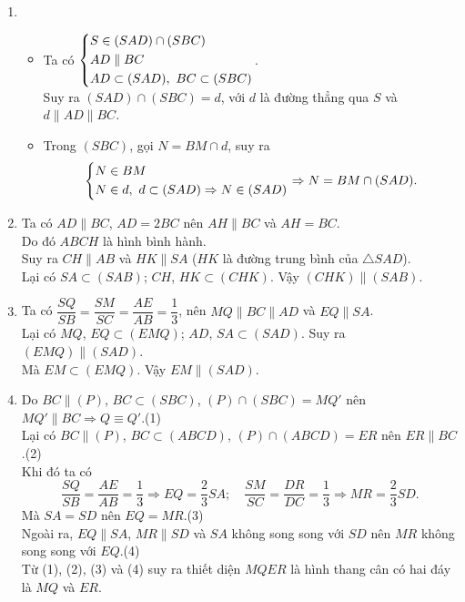 \begin{bt}
{\begin{center}
\end{center}
\begin{enumerate}
\item
\begin{itemize}
\item Ta có $\left\{\begin{aligned}& S\in(SAD)\cap (SBC)\\ & AD\parallel BC\\ & AD\subset(SAD),\,\,BC\subset(SBC)\end{aligned}\right.$.\\
Suy ra $(SAD)\cap (SBC)=d$, với $d$ là đường thẳng qua $S$ và $d\parallel AD\parallel BC$.
\item Trong $(SBC)$, gọi $N=BM\cap d$, suy ra
$$\left\{\begin{aligned}& N\in BM\\ & N\in d,\,\, d\subset (SAD)\Rightarrow N\in (SAD)\end{aligned}\right.\Rightarrow N=BM\cap (SAD).$$
\end{itemize}
\item Ta có $AD\parallel BC$, $AD=2BC$ nên $AH\parallel BC$ và $AH=BC$.\\
Do đó $ABCH$ là hình bình hành.\\
Suy ra $CH\parallel AB$ và $HK\parallel SA$ ($HK$ là đường trung bình của $\triangle SAD$).\\
Lại có $SA\subset (SAB)$; $CH$, $HK\subset (CHK)$. Vậy $(CHK)\parallel(SAB)$.
\item Ta có $\dfrac{SQ}{SB}=\dfrac{SM}{SC}=\dfrac{AE}{AB}=\dfrac{1}{3}$, nên $MQ\parallel BC\parallel AD$ và $EQ\parallel SA$.\\
Lại có $MQ$, $EQ\subset (EMQ)$; $AD$, $SA\subset (SAD)$. Suy ra $(EMQ)\parallel (SAD)$.\\
Mà $EM\subset (EMQ)$. Vậy $EM\parallel (SAD)$.
\item Do $BC\parallel (P)$, $BC\subset (SBC)$, $(P)\cap (SBC)=MQ'$ nên $MQ'\parallel BC\Rightarrow Q\equiv Q'$.\hfill (1)\\
Lại có $BC\parallel (P)$, $BC\subset (ABCD)$, $(P)\cap (ABCD)=ER$ nên $ER\parallel BC$.\hfill (2)\\
Khi đó ta có 
$$\dfrac{SQ}{SB}=\dfrac{AE}{AB}=\dfrac{1}{3}\Rightarrow EQ=\dfrac{2}{3}SA;\quad \dfrac{SM}{SC}=\dfrac{DR}{DC}=\dfrac{1}{3}\Rightarrow MR=\dfrac{2}{3}SD.$$
Mà $SA=SD$ nên $EQ=MR$.\hfill (3)\\
Ngoài ra, $EQ\parallel SA$, $MR\parallel SD$ và $SA$ không song song với $SD$ nên $MR$ không song song với $EQ$.\hfill (4)\\
Từ (1), (2), (3) và (4) suy ra thiết diện $MQER$ là hình thang cân có hai đáy là $MQ$ và $ER$.
\end{enumerate}
}
\end{bt}

